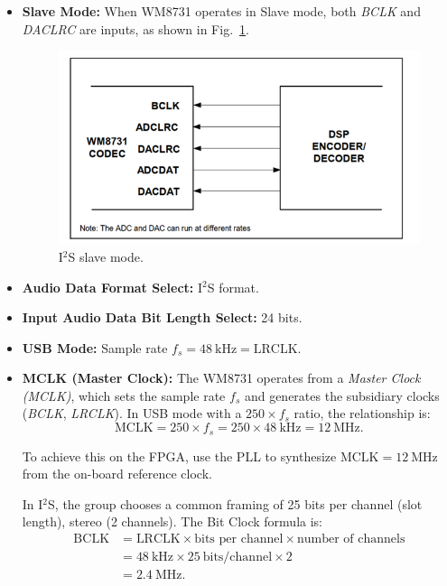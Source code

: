 \begin{itemize}[label=-]
	\item \textbf{Slave Mode:} When WM8731 operates in Slave mode, both \textit{BCLK} and \textit{DACLRC} are inputs, as shown in Fig.~\ref{fig:I2S_slave_mode}.
	
	\begin{figure}[H]
		\centering
		\includegraphics[width=.8\linewidth]{./my-chapters/my-images/theoretical_background/I2S_slave_mode.png}
		\caption{I$^{2}$S slave mode.}
		\label{fig:I2S_slave_mode}
	\end{figure}
	
	\item \textbf{Audio Data Format Select:} I$^{2}$S format.
	
	\item \textbf{Input Audio Data Bit Length Select:} 24 bits.
	
	\item \textbf{USB Mode:} Sample rate $f_{s} = 48~\text{kHz} = \text{LRCLK}$.
	
	\item \textbf{MCLK (Master Clock):} The WM8731 operates from a \textit{Master Clock (MCLK)}, which sets the sample rate $f_{s}$ and generates the subsidiary clocks (\textit{BCLK}, \textit{LRCLK}).  
	In USB mode with a $250 \times f_{s}$ ratio, the relationship is:  
	\[
	\text{MCLK} = 250 \times f_{s} = 250 \times 48~\text{kHz} = 12~\text{MHz}.
	\]
	
	To achieve this on the FPGA, use the PLL to synthesize $\text{MCLK} = 12~\text{MHz}$ from the on-board reference clock.
	
	In I$^{2}$S, the group chooses a common framing of 25 bits per channel (slot length), stereo (2 channels).  
	The Bit Clock formula is:
	\[
	\begin{aligned}
		\text{BCLK} &= \text{LRCLK} \times \text{bits per channel} \times \text{number of channels} \\
		&= 48~\text{kHz} \times 25~\text{bits/channel} \times 2 \\
		&= 2.4~\text{MHz}.
	\end{aligned}
	\]
	
\end{itemize}
